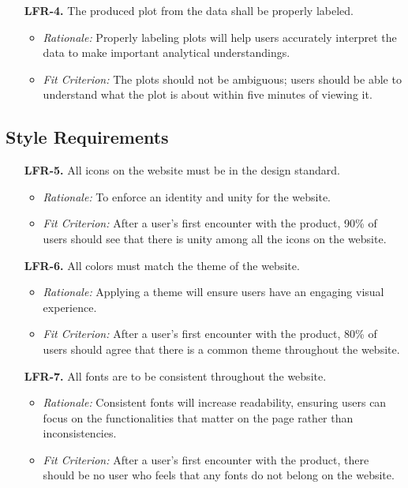 \documentclass[12pt]{article}
\begin{document}
\begin{enumerate}
  \item[\textbf{LFR-4.}] The produced plot from the data shall be properly labeled.
  \begin{itemize}
    \item \textit{Rationale:} Properly labeling plots will help users
    accurately interpret the data to make important analytical understandings.
    \item \textit{Fit Criterion:} The plots should not be ambiguous; users
    should be able to understand what the plot is about within five minutes of
    viewing it.
  \end{itemize}
\end{enumerate}


\subsection{Style Requirements}
\begin{enumerate}
  \item[\textbf{LFR-5.}] All icons on the website must be in the design standard. 
  \begin{itemize}
    \item \textit{Rationale:} To enforce an identity and unity for the website. 
    \item \textit{Fit Criterion:} After a user's first encounter with the product, 90\% of users should
    see that there is unity among all the icons on the website. 
  \end{itemize}
  
  \item[\textbf{LFR-6.}] All colors must match the theme of the website.
  \begin{itemize}
    \item \textit{Rationale:} Applying a theme will ensure users have
    an engaging visual experience.
    \item \textit{Fit Criterion:} After a user's first encounter with the product, 80\% of users
    should agree that there is a common theme throughout the website.
  \end{itemize}
  
  \item[\textbf{LFR-7.}] All fonts are to be consistent throughout the website. 
  \begin{itemize}
    \item \textit{Rationale:} Consistent fonts will increase readability,
    ensuring users can focus on the functionalities that matter on the page rather than inconsistencies. 
    \item \textit{Fit Criterion:} After a user's first encounter with the product, there should
    be no user who feels that any fonts do not belong on the website. 
  \end{itemize}
\end{enumerate}
\end{document}
